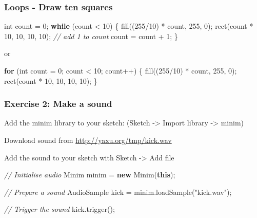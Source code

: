 \documentclass[ignorenonframetext,]{beamer}
\newenvironment{Shaded}{}{}
\newcommand{\KeywordTok}[1]{\textcolor[rgb]{0.00,0.44,0.13}{\textbf{{#1}}}}
\newcommand{\DataTypeTok}[1]{\textcolor[rgb]{0.56,0.13,0.00}{{#1}}}
\newcommand{\DecValTok}[1]{\textcolor[rgb]{0.25,0.63,0.44}{{#1}}}
\newcommand{\StringTok}[1]{\textcolor[rgb]{0.25,0.44,0.63}{{#1}}}
\newcommand{\CommentTok}[1]{\textcolor[rgb]{0.38,0.63,0.69}{\textit{{#1}}}}
\newcommand{\FunctionTok}[1]{\textcolor[rgb]{0.02,0.16,0.49}{{#1}}}
\newcommand{\NormalTok}[1]{{#1}}
\begin{document}
\begin{frame}[fragile]\frametitle{Loops - Draw ten squares}

\begin{Shaded}
\begin{Highlighting}[]
\DataTypeTok{int} \NormalTok{count = }\DecValTok{0}\NormalTok{;}
\KeywordTok{while} \NormalTok{(count < }\DecValTok{10}\NormalTok{) \{}
  \FunctionTok{fill}\NormalTok{((}\DecValTok{255}\NormalTok{/}\DecValTok{10}\NormalTok{) * count, }\DecValTok{255}\NormalTok{, }\DecValTok{0}\NormalTok{);}
  \FunctionTok{rect}\NormalTok{(count * }\DecValTok{10}\NormalTok{, }\DecValTok{10}\NormalTok{, }\DecValTok{10}\NormalTok{, }\DecValTok{10}\NormalTok{);}
  \CommentTok{// add 1 to count}
  \NormalTok{count = count + }\DecValTok{1}\NormalTok{;}
\NormalTok{\} }
\end{Highlighting}
\end{Shaded}

or

\begin{Shaded}
\begin{Highlighting}[]
\KeywordTok{for} \NormalTok{(}\DataTypeTok{int} \NormalTok{count = }\DecValTok{0}\NormalTok{; count < }\DecValTok{10}\NormalTok{; count++) \{}
  \FunctionTok{fill}\NormalTok{((}\DecValTok{255}\NormalTok{/}\DecValTok{10}\NormalTok{) * count, }\DecValTok{255}\NormalTok{, }\DecValTok{0}\NormalTok{);}
  \FunctionTok{rect}\NormalTok{(count * }\DecValTok{10}\NormalTok{, }\DecValTok{10}\NormalTok{, }\DecValTok{10}\NormalTok{, }\DecValTok{10}\NormalTok{);}
\NormalTok{\} }
\end{Highlighting}
\end{Shaded}

\end{frame}

\begin{frame}[fragile]\frametitle{Exercise 2: Make a sound}

Add the minim library to your sketch: (Sketch -\textgreater{} Import
library -\textgreater{} minim)

Download sound from \url{http://yaxu.org/tmp/kick.wav}

Add the sound to your sketch with Sketch -\textgreater{} Add file

\begin{Shaded}
\begin{Highlighting}[]
\CommentTok{// Initialise audio}
\NormalTok{Minim minim = }\KeywordTok{new} \FunctionTok{Minim}\NormalTok{(}\KeywordTok{this}\NormalTok{);}

\CommentTok{// Prepare a sound}
\NormalTok{AudioSample kick = minim.}\FunctionTok{loadSample}\NormalTok{(}\StringTok{"kick.wav"}\NormalTok{);}

\CommentTok{// Trigger the sound}
\NormalTok{kick.}\FunctionTok{trigger}\NormalTok{();}
\end{Highlighting}
\end{Shaded}

\end{frame}
\end{document}
